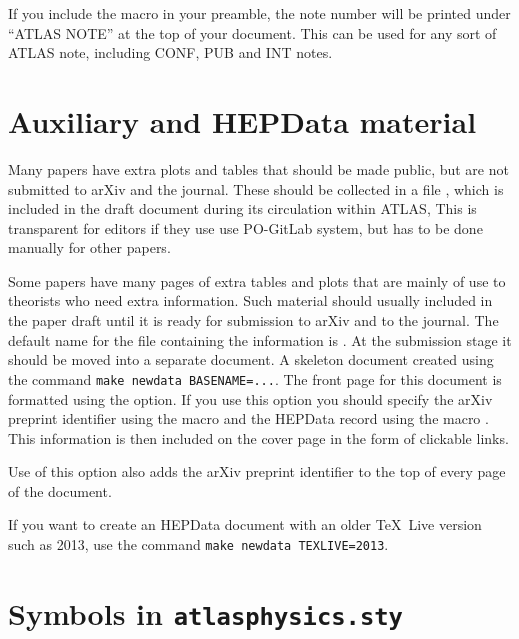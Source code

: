 If you include the macro  in your preamble,
the note number will be printed under \enquote{ATLAS NOTE} at the top of your document.
This can be used for any sort of ATLAS note, including CONF, PUB and INT notes.


\section{Auxiliary and HEPData material}
\label{sec:auxmat}

Many papers have extra plots and tables that should be made public,
but are not submitted to arXiv and the journal.
These should be collected in a file ,
which is included in the draft document during its circulation within ATLAS,
This is transparent for editors if they use use PO-GitLab system,
but has to be done manually for other papers.

Some papers have many pages of extra tables and plots that are mainly of use to theorists
who need extra information.
Such material should usually included in the paper draft until it is ready for
submission to arXiv and to the journal.
The default name for the file containing the information is .
At the submission stage it should be moved into a separate document.
A skeleton document created using the command \verb|make newdata BASENAME=...|.
The front page for this document is formatted using the  option.
If you use this option you should specify the arXiv preprint identifier
using the macro  and the HEPData record using the macro
.
This information is then included on the cover page in the form of clickable links.

Use of this option also adds the arXiv preprint identifier to the top
of every page of the document.

If you want to create an HEPData document with an older \TeX\ Live version such as 2013, 
use the command \texttt{make newdata TEXLIVE=2013}.


\section{Symbols in \texttt{atlasphysics.sty}}
\label{sec:atlasphysics}


